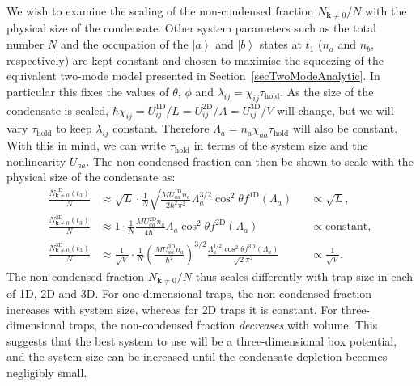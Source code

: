 \documentclass{iopart}
\newcommand{\ket}[1]{\ensuremath{\left|#1\right>}}
\begin{document}
We wish to examine the scaling of the non-condensed fraction $N_{\mathbf{k}\neq0}/N$ with the physical size of the condensate.  Other system parameters such as the total number $N$ and the occupation of the $\ket{a}$ and $\ket{b}$ states at $t_1$ ($n_a$ and $n_b$, respectively) are kept constant and chosen to maximise the squeezing of the equivalent two-mode model presented in Section~\ref{secTwoModeAnalytic}.  In particular this fixes the values of $\theta$, $\phi$ and $\lambda_{ij} = \chi_{ij}\tau_\text{hold}$.  As the size of the condensate is scaled, $\hbar \chi_{ij} = U^\text{1D}_{ij}/L = U^\text{2D}_{ij}/A = U^\text{3D}_{ij}/V$ will change, but we will vary $\tau_\text{hold}$ to keep $\lambda_{ij}$ constant.  Therefore $\Lambda_a = n_a\chi_{aa}\tau_\text{hold}$ will also be constant.  With this in mind, we can write $\tau_\text{hold}$ in terms of the system size and the nonlinearity $U_{aa}$.  The non-condensed fraction can then be shown to scale with the physical size of the condensate as:
\begin{align}
  \frac{N^\text{1D}_{\mathbf{k}\neq 0}(t_3)}{N} &\approx \sqrt{L} \cdot \frac{1}{N} \sqrt{\frac{M U^\text{1D}_{aa} n_a}{2 \hbar^2 \pi^2}} \Lambda_a^{3/2} \cos^2\theta f^\text{1D}(\Lambda_a) &&\propto \sqrt{L}, \\
  \frac{N^\text{2D}_{\mathbf{k}\neq 0}(t_3)}{N} &\approx 1 \cdot \frac{1}{N} \frac{M U^\text{2D}_{aa} n_a }{4 \hbar^2} \Lambda_a \cos^2\theta f^\text{2D}(\Lambda_a) &&\propto \text{constant}, \\
  \frac{N^\text{3D}_{\mathbf{k}\neq 0}(t_3)}{N} &\approx \frac{1}{\sqrt{V}} \cdot \frac{1}{N} \left(\frac{M U^\text{3D}_{aa} n_a}{\hbar^2}\right)^{3/2} \frac{\Lambda_a^{1/2} \cos^2\theta f^\text{3D}(\Lambda_a)}{\sqrt{2} \pi^2} &&\propto \frac{1}{\sqrt{V}}.
\end{align}
The non-condensed fraction $N_{\mathbf{k}\neq 0}/N$ thus scales differently with trap size in each of 1D, 2D and 3D.  For one-dimensional traps, the non-condensed fraction increases with system size, whereas for 2D traps it is constant.  For three-dimensional traps, the non-condensed fraction \emph{decreases} with volume.  This suggests that the best system to use will be a three-dimensional box potential, and the system size can be increased until the condensate depletion becomes negligibly small.
\end{document}

